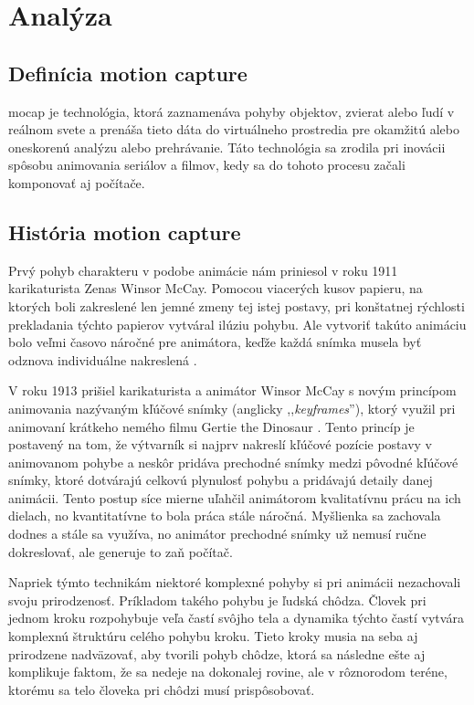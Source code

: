 \section{Analýza}%

\subsection{Definícia motion capture}%

\noindent\acrfull{mocap} je technológia, ktorá zaznamenáva pohyby objektov, zvierat alebo ľudí v reálnom svete a prenáša tieto dáta do virtuálneho prostredia pre okamžitú alebo oneskorenú analýzu alebo prehrávanie. Táto technológia sa zrodila pri inovácii spôsobu animovania seriálov a filmov, kedy sa do tohoto procesu začali komponovať aj počítače.

\subsection{História motion capture}%

Prvý pohyb charakteru v podobe animácie nám priniesol v roku 1911 karikaturista Zenas Winsor McCay. Pomocou viacerých kusov papieru, na ktorých boli zakreslené len jemné zmeny tej istej postavy, pri konštatnej rýchlosti prekladania týchto papierov vytváral ilúziu pohybu. Ale vytvoriť takúto animáciu bolo veľmi časovo náročné pre animátora, keďže každá snímka musela byť odznova individuálne nakreslená \cite{mocapFundamentals}.

V roku 1913 prišiel karikaturista a animátor Winsor McCay s novým princípom animovania nazývaným kľúčové snímky (anglicky ,,\textit{keyframes}''), ktorý využil pri animovaní krátkeho nemého filmu Gertie the Dinosaur \cite{gertieDino}. Tento princíp je postavený na tom, že výtvarník si najprv nakreslí kľúčové pozície postavy v animovanom pohybe a neskôr pridáva prechodné snímky medzi pôvodné kľúčové snímky, ktoré dotvárajú celkovú plynulosť pohybu a pridávajú detaily danej animácii. Tento postup síce mierne uľahčil animátorom kvalitatívnu prácu na ich dielach, no kvantitatívne to bola práca stále náročná. Myšlienka sa zachovala dodnes a stále sa využíva, no animátor prechodné snímky už nemusí ručne dokreslovať, ale generuje to zaň počítač.  

Napriek týmto technikám niektoré komplexné pohyby si pri animácii nezachovali svoju prirodzenosť. Príkladom takého pohybu je ľudská chôdza. Človek pri jednom kroku rozpohybuje veľa častí svôjho tela a dynamika týchto častí vytvára komplexnú štruktúru celého pohybu kroku. Tieto kroky musia na seba aj prirodzene nadväzovať, aby tvorili pohyb chôdze, ktorá sa následne ešte aj komplikuje faktom, že sa nedeje na dokonalej rovine, ale v rôznorodom teréne, ktorému sa telo človeka pri chôdzi musí prispôsobovať.

